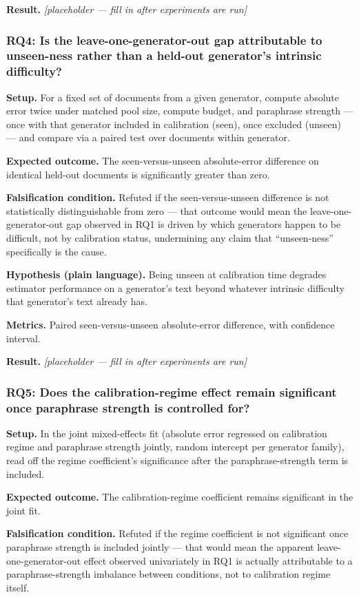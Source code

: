 \documentclass[11pt]{article}
\newcommand{\ph}{\textit{[placeholder --- fill in after experiments are run]}}
\begin{document}
\textbf{Result.} \ph

\subsubsection{RQ4: Is the leave-one-generator-out gap attributable to unseen-ness rather than a held-out generator's intrinsic difficulty?}
\textbf{Setup.} For a fixed set of documents from a given generator, compute absolute error twice under matched pool size, compute budget, and paraphrase strength --- once with that generator included in calibration (seen), once excluded (unseen) --- and compare via a paired test over documents within generator.

\textbf{Expected outcome.} The seen-versus-unseen absolute-error difference on identical held-out documents is significantly greater than zero.

\textbf{Falsification condition.} Refuted if the seen-versus-unseen difference is not statistically distinguishable from zero --- that outcome would mean the leave-one-generator-out gap observed in RQ1 is driven by which generators happen to be difficult, not by calibration status, undermining any claim that ``unseen-ness'' specifically is the cause.

\textbf{Hypothesis (plain language).} Being unseen at calibration time degrades estimator performance on a generator's text beyond whatever intrinsic difficulty that generator's text already has.

\textbf{Metrics.} Paired seen-versus-unseen absolute-error difference, with confidence interval.

\textbf{Result.} \ph

\subsubsection{RQ5: Does the calibration-regime effect remain significant once paraphrase strength is controlled for?}
\textbf{Setup.} In the joint mixed-effects fit (absolute error regressed on calibration regime and paraphrase strength jointly, random intercept per generator family), read off the regime coefficient's significance after the paraphrase-strength term is included.

\textbf{Expected outcome.} The calibration-regime coefficient remains significant in the joint fit.

\textbf{Falsification condition.} Refuted if the regime coefficient is not significant once paraphrase strength is included jointly --- that would mean the apparent leave-one-generator-out effect observed univariately in RQ1 is actually attributable to a paraphrase-strength imbalance between conditions, not to calibration regime itself.
\end{document}
